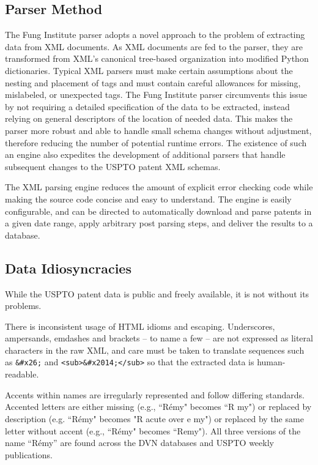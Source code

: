 \subsection{Parser Method}

The Fung Institute parser adopts a novel approach to the problem of extracting data from XML documents. As XML documents are fed to the parser, they are transformed from XML's canonical tree-based organization into modified Python dictionaries. Typical XML parsers must make certain assumptions about the nesting and placement of tags and must contain careful allowances for missing, mislabeled, or unexpected tags. The Fung Institute parser circumvents this issue by not requiring a detailed specification of the data to be extracted, instead relying on general descriptors of the location of needed data. This makes the parser more robust and able to handle small schema changes without adjustment, therefore reducing the number of potential runtime errors. The existence of such an engine also expedites the development of additional parsers that handle subsequent changes to the USPTO patent XML schemas.

The XML parsing engine reduces the amount of explicit error checking code while making the source code concise and easy to understand. The engine is easily configurable, and can be directed to automatically download and parse patents in a given date range, apply arbitrary post parsing steps, and deliver the results to a database.

\subsection{Data Idiosyncracies}

While the USPTO patent data is public and freely available, it is not without its problems.

There is inconsistent usage of HTML idioms and escaping. Underscores, ampersands, emdashes and brackets -- to name a few -- are not expressed as literal characters in the raw XML, and care must be taken to translate sequences such as \verb`&#x26;` and \verb`<sub>&#x2014;</sub>` so that the extracted data is human-readable.

Accents within names are irregularly represented and follow differing standards. Accented letters are either missing (e.g., ``R\'emy" becomes ``R my") or
replaced by description (e.g. ``R\'emy" becomes "R acute over e my") or replaced
by the same letter without accent (e.g., ``R\'emy" becomes ``Remy"). All three
versions of the name ``R\'emy'' are found across the DVN databases and USPTO weekly publications.

